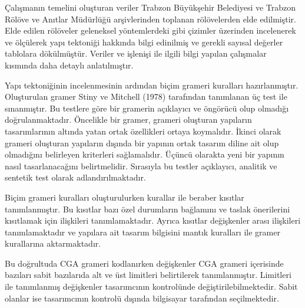 \documentclass[12pt,turkish,a4paperpaper,]{report}
\begin{document}
Çalışmanın temelini oluşturan veriler Trabzon Büyükşehir Belediyesi ve
Trabzon Rölöve ve Anıtlar Müdürlüğü arşivlerinden toplanan rölövelerden
elde edilmiştir. Elde edilen rölöveler geleneksel yöntemlerdeki gibi
çizimler üzerinden incelenerek ve ölçülerek yapı tektoniği hakkında
bilgi edinilmiş ve gerekli sayısal değerler tablolara dökülmüştür.
Veriler ve işlenişi ile ilgili bilgi yapılan çalışmalar kısmında daha
detaylı anlatılmıştır.

Yapı tektoniğinin incelenmesinin ardından biçim grameri kuralları
hazırlanmıştır. Oluşturulan gramer Stiny ve Mitchell (1978) tarafından
tanımlanan üç test ile sınanmıştır. Bu testlere göre bir gramerin
açıklayıcı ve öngörücü olup olmadığı doğrulanmaktadır. Öncelikle bir
gramer, grameri oluşturan yapıların tasarımlarının altında yatan ortak
özellikleri ortaya koymalıdır. İkinci olarak grameri oluşturan yapıların
dışında bir yapının ortak tasarım diline ait olup olmadığını belirleyen
kriterleri sağlamalıdır. Üçüncü olarakta yeni bir yapının nasıl
tasarlanacağını belirtmelidir. Sırasıyla bu testler açıklayıcı, analitik
ve sentetik test olarak adlandırılmaktadır.

Biçim grameri kuralları oluşturulurken kurallar ile beraber kısıtlar
tanımlanmıştır. Bu kısıtlar bazı özel durumların bağlamını ve taslak
önerilerini kısıtlamak için ilişkileri tanımlamaktadır. Ayrıca kısıtlar
değişkenler arası ilişkileri tanımlamaktadır ve yapılara ait tasarım
bilgisini mantık kuralları ile gramer kurallarına aktarmaktadır.

Bu doğrultuda CGA grameri kodlanırken değişkenler CGA grameri içerisinde
bazıları sabit bazılarıda alt ve üst limitleri belirtilerek
tanımlanmıştır. Limitleri ile tanımlanmış değişkenler tasarımcının
kontrolünde değiştirilebilmektedir. Sabit olanlar ise tasarımcının
kontrolü dışında bilgisayar tarafından seçilmektedir.
\end{document}
